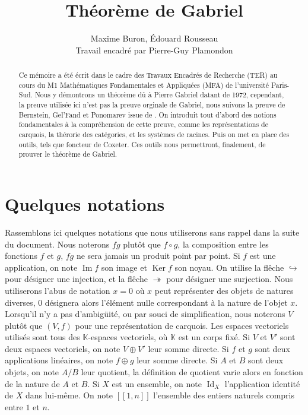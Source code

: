 \documentclass[a4paper,10pt]{article}
\title{Théorème de Gabriel}
\author{Maxime Buron, Édouard Rousseau\\
Travail encadré par Pierre-Guy Plamondon}
\DeclareMathOperator{\Ker}{Ker}
\DeclareMathOperator{\Id}{Id}
\DeclareMathOperator{\Img}{Im}
\begin{document}
\maketitle

\begin{abstract} 
	Ce mémoire a été écrit dans le cadre des Travaux Encadrés de Recherche (TER) au cours du M1 Mathématiques Fondamentales et Appliquées (MFA) de l'université Paris-Sud. Nous y démontrons un théorème dû à Pierre Gabriel datant de 1972, cependant, la preuve utilisée ici n'est pas la preuve orginale de Gabriel, nous suivons la preuve de Bernstein, Gel'Fand et Ponomarev issue de \cite{BGP72}. On introduit tout d'abord des notions fondamentales à la compréhension de cette preuve, comme les représentations de carquois, la thérorie des catégories, et les systèmes de racines. Puis on met en place des outils, tels que foncteur de Coxeter. Ces outils nous permettront, finalement, de prouver le théorème de Gabriel.
\end{abstract}

\tableofcontents

\clearpage
\section*{Quelques notations}
Rassemblons ici quelques notations que nous utiliserons sans rappel dans la suite du document. Nous noterons $fg$ plutôt que $f\circ g$, la composition entre les fonctions $f$ et $g$, $fg$ ne sera jamais un produit point par point. Si $f$ est une application, on note $\Img f$ son image et $\Ker f$ son noyau. On utilise la flêche $\hookrightarrow$ pour désigner une injection, et la flêche $\twoheadrightarrow$ pour désigner une surjection. Nous utiliserons l'abus de notation $x=0$ où $x$ peut représenter des objets de natures diverses, $0$ désignera alors l'élément nulle correspondant à la nature de l'objet $x$. Lorsqu'il n'y a pas d'ambigüité, ou par souci de simplification, nous noterons $V$ plutôt que $(V,f)$ pour une représentation de carquois. Les espaces vectoriels utilisés sont tous des $\mathbb K$-espaces vectoriels, où $\mathbb K$ est un corps fixé. Si $V$ et $V'$ sont deux espaces vectoriels, on note $V\oplus V'$ leur somme directe. Si $f$ et $g$ sont deux applications linéaires, on note $f\oplus g$ leur somme directe. Si $A$ et $B$ sont deux objets, on note $A/B$ leur quotient, la définition de quotient varie alors en fonction de la nature de $A$ et $B$. Si $X$ est un ensemble, on note $\Id_X$ l'application identité de $X$ dans lui-même.  On note $[\![1,n]\!]$ l'ensemble des entiers naturels compris entre $1$ et $n$. 
        
\end{document}
